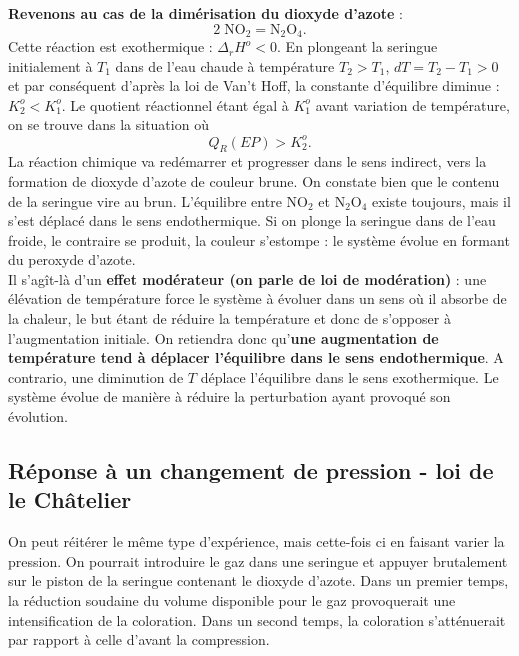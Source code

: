 \documentclass[11pt,a4paper]{report}
\begin{document}
\textbf{Revenons au cas de la dimérisation du dioxyde d'azote} :
\begin{equation}
	 2\;\text{NO}_2 = \text{N}_2\text{O}_4.
\end{equation}
Cette réaction est exothermique : $\Delta_r H^o < 0$. En plongeant la seringue initialement à $T_1$ dans de l'eau chaude à température $T_2 > T_1$, $dT = T_2 - T_1> 0$ et par conséquent d'après la loi de Van't Hoff, la constante d'équilibre diminue : $K_2^o < K_1^o$. Le quotient réactionnel étant égal à $K_1^o$ avant variation de température, on se trouve dans la situation où
\begin{equation}
	Q_R(EP) > K_2^o.
\end{equation}
La réaction chimique va redémarrer et progresser dans le sens indirect, vers la formation de dioxyde d'azote de couleur brune. On constate bien que le contenu de la seringue vire au brun. L'équilibre entre $\text{NO}_2$ et $\text{N}_2\text{O}_4$ existe toujours, mais il s'est déplacé dans le sens endothermique. Si on plonge la seringue dans de l'eau froide, le contraire se produit, la couleur s'estompe : le système évolue en formant du peroxyde d'azote.\\

Il s'agît-là d'un \textbf{effet modérateur (on parle de loi de modération)} : une élévation de température force le système à évoluer dans un sens où il absorbe de la chaleur, le but étant de réduire la température et donc de s'opposer à l'augmentation initiale. On retiendra donc qu'\textbf{une augmentation de température tend à déplacer l'équilibre dans le sens endothermique}. A contrario, une diminution de $T$ déplace l'équilibre dans le sens exothermique. Le système évolue de manière à réduire la perturbation ayant provoqué son évolution.

\subsection{Réponse à un changement de pression - loi de le Châtelier}

On peut réitérer le même type d'expérience, mais cette-fois ci en faisant varier la pression. On pourrait introduire le gaz dans une seringue et appuyer brutalement sur le piston de la seringue contenant le dioxyde d'azote. Dans un premier temps, la réduction soudaine du volume disponible pour le gaz provoquerait une intensification de la coloration. Dans un second temps, la coloration s'atténuerait par rapport à celle d'avant la compression.\\
\end{document}
